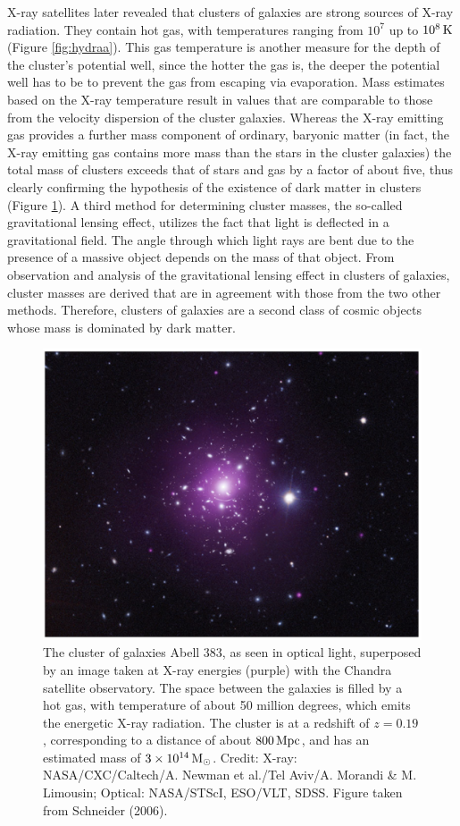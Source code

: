 \documentclass[a4paper,11pt]{article}
\begin{document}
{\noindent}X-ray satellites later revealed that clusters of galaxies are strong sources of X-ray radiation. They contain hot gas, with temperatures ranging from $10^7$ up to $10^8\,{\rm K}$ (Figure \ref{fig:hydraa}). This gas temperature is another measure for the depth of the cluster's potential well, since the hotter the gas is, the deeper the potential well has to be to prevent the gas from escaping via evaporation. Mass estimates based on the X-ray temperature result in values that are comparable to those from the velocity dispersion of the cluster galaxies. Whereas the X-ray emitting gas provides a further mass component of ordinary, baryonic matter (in fact, the X-ray emitting gas contains more mass than the stars in the cluster galaxies) the total mass of clusters exceeds that of stars and gas by a factor of about five, thus clearly confirming the hypothesis of the existence of dark matter in clusters (Figure \ref{fig:abell383}). A third method for determining cluster masses, the so-called gravitational lensing effect, utilizes the fact that light is deflected in a gravitational field. The angle through which light rays are bent due to the presence of a massive object depends on the mass of that object. From observation and analysis of the gravitational lensing effect in clusters of galaxies, cluster masses are derived that are in agreement with those from the two other methods. Therefore, clusters of galaxies are a second class of cosmic objects whose mass is dominated by dark matter.

\begin{figure}[h]
    \centering
    \includegraphics[width=12cm]{figures/Abell383.png}
    \caption{\footnotesize{The cluster of galaxies Abell 383, as seen in optical light, superposed by an image taken at X-ray energies (purple) with the Chandra satellite observatory. The space between the galaxies is filled by a hot gas, with temperature of about 50 million degrees, which emits the energetic X-ray radiation. The cluster is at a redshift of $z=0.19$, corresponding to a distance of about $800\,{\rm Mpc}$, and has an estimated mass of $3\times10^{14}\,{\rm M_\odot}$. Credit: X-ray: NASA/CXC/Caltech/A. Newman et al./Tel Aviv/A. Morandi \& M. Limousin; Optical: NASA/STScI, ESO/VLT, SDSS. Figure taken from Schneider (2006).}}
    \label{fig:abell383}
\end{figure}
\end{document}
